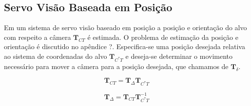 \subsection{Servo Visão Baseada em Posição}
Em um sistema de servo visão baseado em posição a posição e orientação do alvo com respeito a câmera $\bm{T}_{CT}$ é estimada. O problema de estimação da posição e orientação é discutido no apêndice ?.
Especifica-se uma posição desejada relativa ao sistema de coordenadas do alvo  $\bm{T}_{C^*T}$ e deseja-se determinar o movimento necessário para mover a câmera para a posição desejada, que chamamos de $\bm{T}_\delta$.

\begin{equation}
 \bm{T}_{CT} =  \bm{T}_\Delta \bm{T}_{C^*T}
\end{equation}

\begin{equation}
 \bm{T}_\Delta  =   \bm{T}_{CT} \bm{T}_{C^*T}^{-1}
\end{equation}